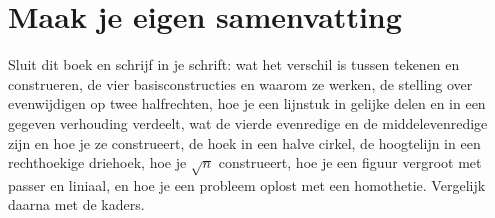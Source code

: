 \begin{oefeningen}






\end{oefeningen}


\ifzelfstudie
\section*{Maak je eigen samenvatting}
Sluit dit boek en schrijf in je schrift: wat het verschil is tussen tekenen en construeren, de vier basisconstructies en waarom ze werken, de stelling over evenwijdigen op twee halfrechten, hoe je een lijnstuk in gelijke delen en in een gegeven verhouding verdeelt, wat de vierde evenredige en de middelevenredige zijn en hoe je ze construeert, de hoek in een halve cirkel, de hoogtelijn in een rechthoekige driehoek, hoe je $\sqrt{n}$ construeert, hoe je een figuur vergroot met passer en liniaal, en hoe je een probleem oplost met een homothetie. Vergelijk daarna met de kaders.
\fi
